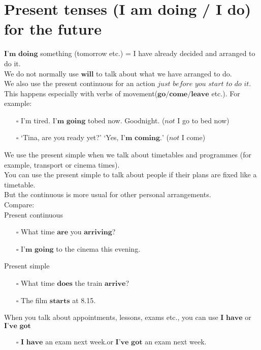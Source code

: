 \section{Present tenses (I am doing / I do) for the future}
\label{Present tenses (I am doing / I do) for the future}
$\textbf{I'm doing}$ something (tomorrow etc.) = I have already decided and arranged to do it. \\
We do not normally use $\textbf{will}$ to talk about what we have arranged to do. \\
We also use the present continuous for an action $\textit{just before you start to do it}$. This happens especially with verbs of movement($\textbf{go/come/leave}$ etc.). For example:
\begin{itemize}
    \item[$\square$] I'm tired. I$\textbf{'m going}$ tobed now. Goodnight. ($\textit{not}$ I go to bed now)
    \item[$\square$] `Tina, are you ready yet?' `Yes, I$\textbf{'m coming.}$' ($\textit{not}$ I come)
\end{itemize}
We use the present simple when we talk about timetables and programmes (for example, transport or cinema times). \\
You can use the present simple to talk about people if their plans are fixed like a timetable. \\
But the continuous is more usual for other personal arrangements. \\
Compare: \\
Present continuous
\begin{itemize}
    \item[$\square$] What time $\textbf{are}$ you $\textbf{arriving}$?
    \item[$\square$] I$\textbf{'m going}$ to the cinema this evening.
\end{itemize}
Present simple
\begin{itemize}
    \item[$\square$] What time $\textbf{does}$ the train $\textbf{arrive}$?
    \item[$\square$] The film $\textbf{starts}$ at 8.15.
\end{itemize}
When you talk about appointments, lessons, exams etc., you can use $\textbf{I have}$ or $\textbf{I've got}$
\begin{itemize}
    \item[$\square$] $\textbf{I have}$ an exam next week.\qquad or \qquad$\textbf{I've got}$ an exam next week.
\end{itemize}
